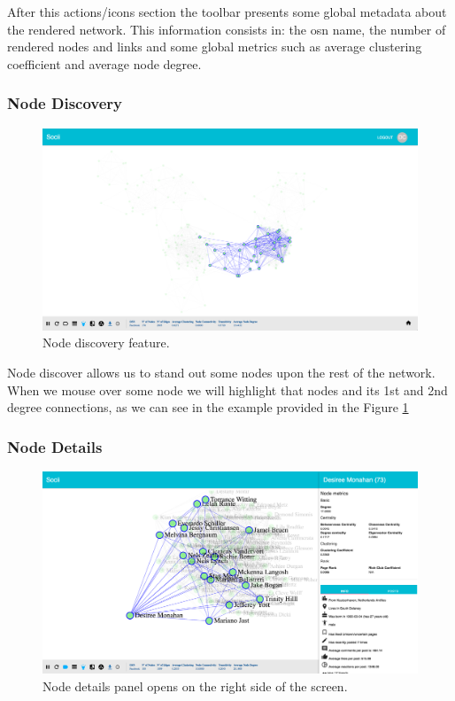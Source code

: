 \indent After this actions/icons section the toolbar presents some global metadata about the rendered network. This information consists in: the \gls{osn} name, the number of rendered nodes and links and some global metrics such as average clustering coefficient and average node degree.

\subsubsection{Node Discovery}

\begin{figure}[h!]
\begin{center}
  \hspace*{-0.8in}
  \includegraphics[width=1.2\textwidth]{img/socii/socii_5.png}
\end{center}
\caption{\label{img:socii_5} Node discovery feature.}
\end{figure}

Node discover allows us to stand out some nodes upon the rest of the network. When we mouse over some node we will highlight that nodes and its 1st and 2nd degree connections, as we can see in the example provided in the Figure \ref{img:socii_5}

\subsubsection{Node Details}

\begin{figure}[h!]
\begin{center}
  \hspace*{-0.8in}
  \includegraphics[width=1.2\textwidth]{img/socii/socii_6.png}
\end{center}
\caption{\label{img:socii_6} Node details panel opens on the right side of the screen.}
\end{figure}

